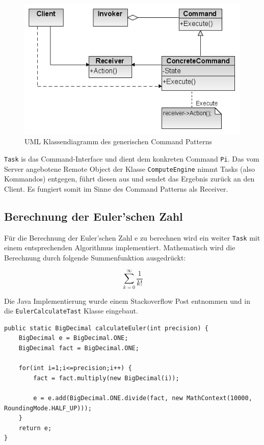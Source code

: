 \begin{figure}[!h]
	\begin{center}
		\includegraphics[width=0.5\linewidth]{images/Command_design_pattern.png}
		\caption{UML Klassendiagramm des generischen Command Patterns \cite{command-pattern-uml}}
		\label{broker}
	\end{center}
\end{figure}

\texttt{Task} is das Command-Interface und dient dem konkreten Command \texttt{Pi}.
Das vom Server angebotene Remote Object der Klasse \texttt{ComputeEngine} nimmt Tasks (also Kommandos) entgegen, f\"uhrt diesen aus und sendet das Ergebnis zur\"uck an den Client.
Es fungiert somit im Sinne des Command Patterns als Receiver.

\subsection{Berechnung der Euler'schen Zahl}
F\"ur die Berechnung der Euler'schen Zahl e zu berechnen wird ein weiter \texttt{Task} mit einem entsprechenden Algorithmus implementiert.
Mathematisch wird die Berechnung durch folgende Summenfunktion ausgedr\"uckt:

\begin{equation*}
\displaystyle\sum_{k=0}^{\infty} \dfrac{1}{k!}
\end{equation*}

Die Java Implementierung wurde einem Stackoverflow Post\cite{euler-stackoverflow} entnommen und in die \texttt{EulerCalculateTast} Klasse eingebaut.

\begin{lstlisting}[style=Java, caption=Funktion zur n\"aeherungweisen Berechnung der Euler'schen Zahl]
public static BigDecimal calculateEuler(int precision) {
    BigDecimal e = BigDecimal.ONE;
    BigDecimal fact = BigDecimal.ONE;

    for(int i=1;i<=precision;i++) {
        fact = fact.multiply(new BigDecimal(i));

        e = e.add(BigDecimal.ONE.divide(fact, new MathContext(10000, RoundingMode.HALF_UP)));
    }
    return e;
}
\end{lstlisting}



